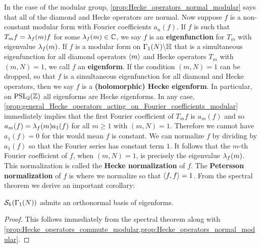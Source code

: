       In the case of the modular group, \cref{prop:Hecke_operators_normal_modular} says that all of the diamond and Hecke operators are normal. Now suppose $f$ is a non-constant modular form with Fourier coefficients $a_{n}(f)$. If $f$ is such that $T_{m}f = \lambda_{f}(m)f$ for some $\lambda_{f}(m) \in \mathbb{C}$, we say $f$ is an \textbf{eigenfunction} for $T_{m}$ with eigenvalue $\lambda_{f}(m)$. If $f$ is a modular form on $\Gamma_{1}(N)\backslash\mathbb{H}$ that is a simultaneous eigenfunction for all diamond operators $\langle m\rangle$ and Hecke operators $T_{m}$ with $(m,N) = 1$, we call $f$ an \textbf{eigenform}. If the condition $(m,N) = 1$ can be dropped, so that $f$ is a simultaneous eigenfunction for all diamond and Hecke operators, then we say $f$ is a \textbf{(holomorphic) Hecke eigenform}. In particular, on $\mathrm{PSL}_{2}(\mathbb{Z})$ all eigenforms are Hecke eigenforms. In any case, \cref{prop:general_Hecke_operators_acting_on_Fourier_coefficients_modular} immediately implies that the first Fourier coefficient of $T_{m}f$ is $a_{m}(f)$ and so $a_{m}(f) = \lambda_{f}(m)a_{1}(f)$ for all $m \ge 1$ with $(m,N) = 1$. Therefore we cannot have $a_{1}(f) = 0$ for this would mean $f$ is constant. We can normalize $f$ by dividing by $a_{1}(f)$ so that the Fourier series has constant term $1$. It follows that the $m$-th Fourier coefficient of $f$, when $(m,N) = 1$, is precisely the eigenvalue $\lambda_{f}(m)$. This normalization is called the \textbf{Hecke normalization} of $f$. The \textbf{Petersson normalization} of $f$ is where we normalize so that $\langle f,f\rangle = 1$. From the spectral theorem we derive an important corollary:

      \begin{theorem}\label{thm:eigenforms_forms_spectral_theory_modular}
        $\mathcal{S}_{k}(\Gamma_{1}(N))$ admits an orthonormal basis of eigenforms.
      \end{theorem}
      \begin{proof}
        This follows immediately from the spectral theorem along with \cref{prop:Hecke_operators_commute_modular,prop:Hecke_operators_normal_modular}.
      \end{proof}

